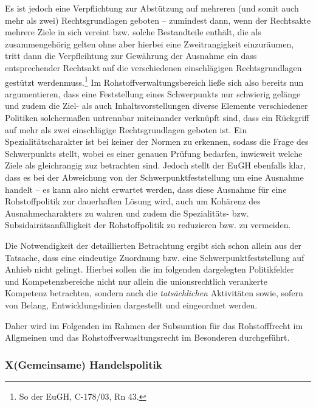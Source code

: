 \documentclass[12pt,a4paper,oneside]{book} %
\begin{document}
Es ist jedoch eine Verpflichtung zur Abstützung auf mehreren (und somit auch mehr als zwei) Rechtsgrundlagen geboten -- zumindest dann, wenn der Rechtsakte mehrere Ziele in sich vereint bzw. solche Bestandteile enthält, die als zusammengehörig gelten ohne aber hierbei eine Zweitrangigkeit einzuräumen, tritt dann die Verpflcihtung zur Gewährung der Ausnahme ein dass entsprechender Rechtsakt auf die \glqq verschiedenen einschlägigen Rechtsgrundlagen gestützt werden\grqq muss.\footnote{So der EuGH, C-178/03, Rn 43.} Im Rohstoffverwaltungsbereich ließe sich also bereits nun argumentieren, dass eine Feststellung eines Schwerpunkts nur schwierig gelänge und zudem die Ziel- als auch Inhaltsvorstellungen diverse Elemente verschiedener Politiken solchermaßen untrennbar miteinander verknüpft sind, dass ein Rückgriff auf mehr als zwei einschlägige Rechtsgrundlagen geboten ist. Ein Spezialitätscharakter ist bei keiner der Normen zu erkennen, sodass die Frage des Schwerpunkts stellt, wobei es einer genauen Prüfung bedarfen, inwieweit welche Ziele als gleichrangig zuz betrachten sind. Jedoch stellt der EuGH ebenfalls klar, dass es bei der Abweichung von der Schwerpunktfeststellung um eine Ausnahme handelt -- es kann also nicht erwartet werden, dass diese Ausnahme für eine Rohstoffpolitik zur dauerhaften Lösung wird, auch um Kohärenz des Ausnahmecharakters zu wahren und zudem die Spezialitäts- bzw. Subsidairätsanfälligkeit der Rohstoffpolitik zu reduzieren bzw. zu vermeiden.
	
Die Notwendigkeit der detaillierten Betrachtung ergibt sich schon allein aus der Tatsache, dass eine eindeutige Zuordnung bzw. eine Schwerpunktfeststellung auf Anhieb nicht gelingt. Hierbei sollen die im folgenden dargelegten Politikfelder und Kompetenzbereiche nicht nur allein die unionsrechtlich verankerte Kompetenz betrachten, sondern auch die \textit{tatsächlichen} Aktivitäten sowie, sofern von Belang, Entwicklungslinien dargestellt und eingeordnet werden.
	
Daher wird im Folgenden im Rahmen der Subsumtion für das Rohstofffrecht im Allgmeinen und das Rohstoffverwasltungsrecht im Besonderen durchgeführt.
	
\subsubsection{X(Gemeinsame) Handelspolitik}

	
\end{document}

